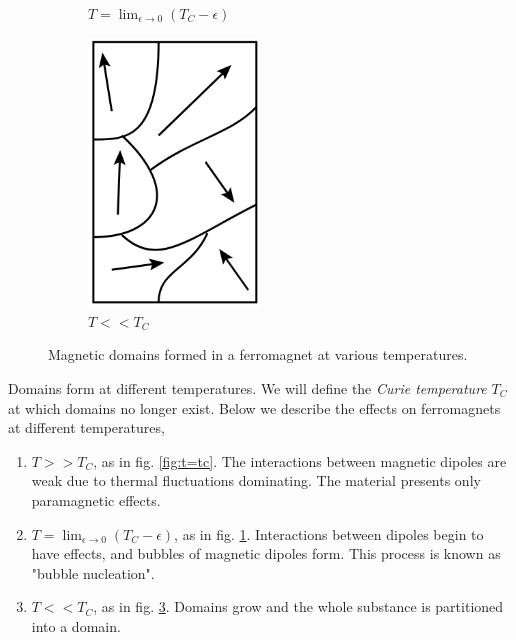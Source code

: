 \documentclass{book}
\begin{document}
\begin{figure}
\begin{subfigure}{0.3\textwidth}
		\caption{$T = \lim_{\epsilon \to 0} (T_C - \epsilon)$}
		\label{fig:t - e}
	\end{subfigure}
	\begin{subfigure}{0.3\textwidth}
		\centering
		\includegraphics[width=0.5\textwidth]{T__T_C.png}
		\caption{$T << T_C$}
		\label{fig: t < tc}
	\end{subfigure}
	\caption{Magnetic domains formed in a ferromagnet at various temperatures.}
\end{figure}
Domains form at different temperatures. We will define the \textit{Curie temperature} $T_C$ at which domains no longer exist. Below we describe the effects on ferromagnets at different temperatures,
\begin{enumerate}
	\item $T >> T_C$, as in fig. \ref{fig:t=tc}. The interactions between magnetic dipoles are weak due to thermal fluctuations dominating. The material presents only paramagnetic effects.
	\item $T = \lim_{\epsilon \to 0}(T_C - \epsilon)$, as in fig. \ref{fig:t - e}. Interactions between dipoles begin to have effects, and bubbles of magnetic dipoles form. This process is known as "bubble nucleation".
	\item $T << T_C$, as in fig. \ref{fig: t < tc}. Domains grow and the whole substance is partitioned into a domain.
\end{enumerate}
\end{document}
